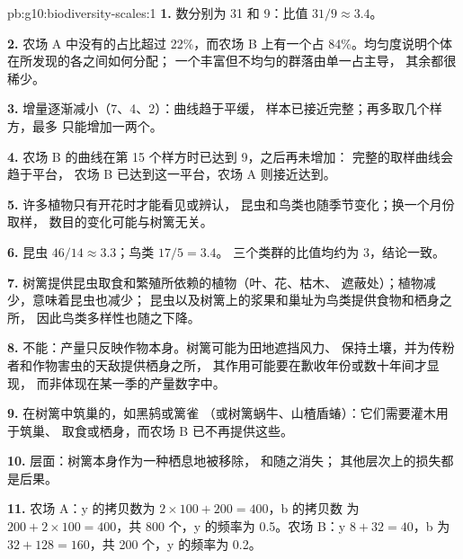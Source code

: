 \begin{solution}{pb:g10:biodiversity-scales:1}
\textbf{1.} 数分别为 31 和 9：比值 $31/9 \approx 3.4$。

\textbf{2.} 农场 A 中没有的占比超过 22\%，而农场
B 上有一个占 84\%。均匀度说明个体在所发现的各之间如何分配；
一个丰富但不均匀的群落由单一占主导，
其余都很稀少。

\textbf{3.} 增量逐渐减小（7、4、2）：曲线趋于平缓，
样本已接近完整；再多取几个样方，最多
只能增加一两个。

\textbf{4.} 农场 B 的曲线在第 15 个样方时已达到 9，之后再未增加：
完整的取样曲线会趋于平台，
农场 B 已达到这一平台，农场 A 则接近达到。

\textbf{5.} 许多植物只有开花时才能看见或辨认，
昆虫和鸟类也随季节变化；换一个月份取样，
数目的变化可能与树篱无关。

\textbf{6.} 昆虫 $46/14 \approx 3.3$；鸟类 $17/5 = 3.4$。
三个类群的比值均约为 3，结论一致。

\textbf{7.} 树篱提供昆虫取食和繁殖所依赖的植物（叶、花、枯木、
遮蔽处）；植物减少，意味着昆虫也减少；
昆虫以及树篱上的浆果和巢址为鸟类提供食物和栖身之所，
因此鸟类多样性也随之下降。

\textbf{8.} 不能：产量只反映作物本身。树篱可能为田地遮挡风力、
保持土壤，并为传粉者和作物害虫的天敌提供栖身之所，
其作用可能要在歉收年份或数十年间才显现，
而非体现在某一季的产量数字中。

\textbf{9.} 在树篱中筑巢的，如黑鸫或篱雀
（或树篱蜗牛、山楂盾蝽）：它们需要灌木用于筑巢、
取食或栖身，而农场 B 已不再提供这些。

\textbf{10.} 层面：树篱本身作为一种栖息地被移除，
和随之消失；
其他层次上的损失都是后果。

\textbf{11.} 农场 A：y 的拷贝数为 $2 \times 100 + 200 = 400$，b 的拷贝数
为 $200 + 2 \times 100 = 400$，共 800 个，y 的频率为 0.5。农场 B：y
$8 + 32 = 40$，b 为 $32 + 128 = 160$，共 200 个，y 的频率为 0.2。


\end{solution}
